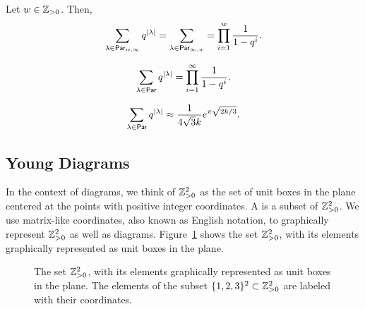 \begin{theorem}
    Let \(w \in \mathbb{Z}_{> 0}\).
    Then,
    \begin{equation}
        \sum_{\lambda \in \operatorname{\mathsf{Par}}_{w, \infty}} q^{|\lambda|}
        = \sum_{\lambda \in \operatorname{\mathsf{Par}}_{\infty, w}}
        = \prod_{i=1}^{w} \frac{1}{1 - q^i}.
    \end{equation}
\end{theorem}

\begin{corollary}
    \begin{equation}
        \sum_{\lambda \in \operatorname{\mathsf{Par}}} q^{|\lambda|}
        = \prod_{i=1}^{\infty} \frac{1}{1 - q^i}.
    \end{equation}
\end{corollary}

\begin{theorem}
    \begin{equation}
        [q^k] \sum_{\lambda \in \Par} q^{|\lambda|}
        \approx \frac{1}{4 \sqrt{3} k} e^{\pi \sqrt{2k/3}}.
    \end{equation}
\end{theorem}

\subsection{Young Diagrams} \label{subsec:diagrams}

In the context of diagrams,
we think of \(\mathbb{Z}_{> 0}^2\) as the set of unit boxes in the plane centered at the points with positive integer coordinates.
A  is a subset of \(\mathbb{Z}_{> 0}^2\).
We use matrix-like coordinates, also known as English notation, to graphically represent \(\mathbb{Z}_{> 0}^2\) as well as diagrams.
Figure~\ref{fig:positives2} shows the set \(\mathbb{Z}_{> 0}^2\), with its elements graphically represented as unit boxes in the plane.
\begin{figure}[htbp]
    \centering
    \caption{The set \(\mathbb{Z}_{> 0}^2\), with its elements graphically represented as unit boxes in the plane. The elements of the subset \(\interval{3}^2 \subset \positives^2\) are labeled with their coordinates.}
    \label{fig:positives2}
\end{figure}

